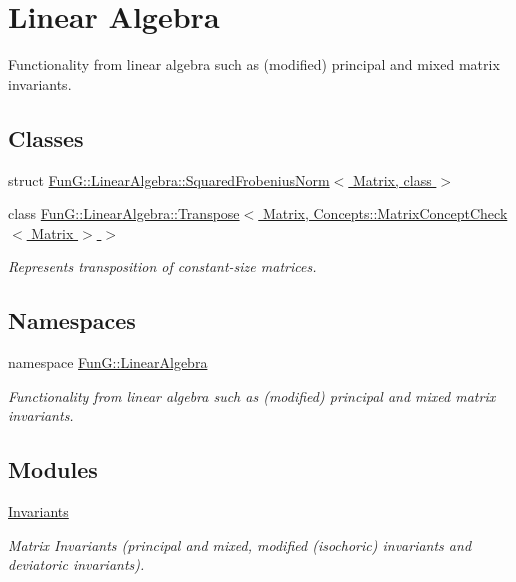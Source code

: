 \hypertarget{group__LinearAlgebraGroup}{\section{\-Linear \-Algebra}
\label{group__LinearAlgebraGroup}
}


\-Functionality from linear algebra such as (modified) principal and mixed matrix invariants.  


\subsection*{\-Classes}
\begin{DoxyCompactItemize}
\item 
struct \hyperlink{structFunG_1_1LinearAlgebra_1_1SquaredFrobeniusNorm}{\-Fun\-G\-::\-Linear\-Algebra\-::\-Squared\-Frobenius\-Norm$<$ Matrix, class $>$}
\item 
class \hyperlink{classFunG_1_1LinearAlgebra_1_1Transpose_3_01Matrix_00_01Concepts_1_1MatrixConceptCheck_3_01Matrix_01_4_01_4}{\-Fun\-G\-::\-Linear\-Algebra\-::\-Transpose$<$ Matrix, Concepts\-::\-Matrix\-Concept\-Check$<$ Matrix $>$ $>$}
\begin{DoxyCompactList}\small\item\em \-Represents transposition of constant-\/size matrices. \end{DoxyCompactList}\end{DoxyCompactItemize}
\subsection*{\-Namespaces}
\begin{DoxyCompactItemize}
\item 
namespace \hyperlink{namespaceFunG_1_1LinearAlgebra}{\-Fun\-G\-::\-Linear\-Algebra}
\begin{DoxyCompactList}\small\item\em \-Functionality from linear algebra such as (modified) principal and mixed matrix invariants. \end{DoxyCompactList}\end{DoxyCompactItemize}
\subsection*{\-Modules}
\begin{DoxyCompactItemize}
\item 
\hyperlink{group__InvariantGroup}{\-Invariants}
\begin{DoxyCompactList}\small\item\em \-Matrix \-Invariants (principal and mixed, modified (isochoric) invariants and deviatoric invariants). \end{DoxyCompactList}\end{DoxyCompactItemize}
